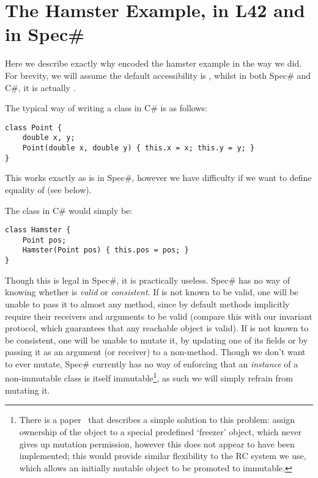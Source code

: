 \section{The Hamster Example, in L42 and in Spec\#}
\label{s:hamster}





Here we describe exactly why encoded the
hamster example in the way we did. For brevity, we will assume the default accessibility is \Q@public@, whilst in both Spec\# and C\#, it is actually \Q@private@.

The typical way of writing a \Q@Point@ class in C\# is as follows:
\begin{lstlisting}
class Point {
	double x, y;
	Point(double x, double y) { this.x = x; this.y = y; }
}
\end{lstlisting}

This works exactly as is in Spec\#, however we have difficulty if we want to define equality of \Q@Point@s (see below).

The \Q@Hamster@ class in C\# would simply be:
\begin{lstlisting}
class Hamster {
	Point pos;
	Hamster(Point pos) { this.pos = pos; }
}
\end{lstlisting}

Though this is legal in Spec\#, it is practically useless. Spec\# has no way of knowing whether \Q@pos@ is \emph{valid} or \emph{consistent}. If \Q@pos@ is not known to be valid, one will be unable to pass it to almost any method, since by default methods implicitly require their receivers and arguments to be valid (compare this with our invariant protocol, which guarantees that any reachable object is valid).
If \Q@pos@ is not known to be consistent, one will be unable to mutate it, by updating one of its fields or by passing it as an argument (or receiver) to a non-\Q@Pure@ method.
Though we don't want \Q@pos@ to ever mutate, Spec\# currently has no way of enforcing that an \emph{instance} of a non-immutable class is itself immutable\footnote{There is a paper~\cite{DBLP:conf/vstte/LeinoMW08} that describes a simple solution to this problem: assign ownership of the object to a special predefined `freezer' object, which never gives up mutation permission, however this does not appear to have been implemented; this would provide similar flexibility to the RC system we use, which allows an initially mutable object to be promoted to immutable.}, as such we will simply refrain from mutating it.


